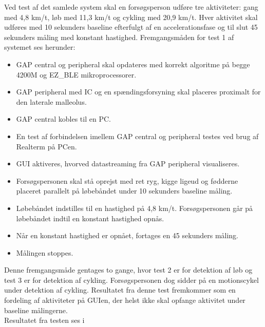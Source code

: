 Ved test af det samlede system skal en forsøgsperson udføre tre aktiviteter: gang med 4,8 km/t, løb med 11,3 km/t og cykling med 20,9 km/t. Hver aktivitet skal udføres med 10 sekunders baseline efterfulgt af en accelerationsfase og til slut 45 sekunders måling med konstant hastighed. Fremgangsmåden for test 1 af systemet ses herunder: 
\begin{itemize}
	\item GAP central og peripheral skal opdateres med korrekt algoritme på begge 4200M og EZ\_BLE mikroprocessorer.
	\item GAP peripheral med IC og en spændingsforsyning skal placeres proximalt for den laterale malleolus.
	\item GAP central kobles til en PC. 
	\item En test af forbindelsen imellem GAP central og peripheral testes ved brug af Realterm på PCen.
	\item GUI aktiveres, hvorved datastreaming fra GAP peripheral visualiseres.
	\item Forsøgspersonen skal stå oprejst med ret ryg, kigge ligeud og fødderne placeret parallelt på løbebåndet under 10 sekunders baseline måling.
	\item Løbebåndet indstilles til en hastighed på 4,8 km/t. Forsøgspersonen går på løbebåndet indtil en konstant hastighed opnås.
	\item Når en konstant hastighed er opnået, fortages en 45 sekunders måling.
	\item Målingen stoppes.
\end{itemize}
Denne fremgangsmåde gentages to gange, hvor test 2 er for detektion af løb og test 3 er for detektion af cykling. Forsøgspersonen dog sidder på en motionscykel under detektion af cykling. Resultatet fra denne test fremkommer som en fordeling af aktiviteter på GUIen, der helst ikke skal opfange aktivitet under baseline målingerne. \\
Resultatet fra testen ses i 
